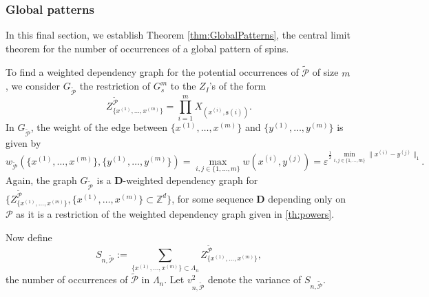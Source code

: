 \documentclass{amsart}
\newcommand{\field}[1]{\mathbb{#1}}
\newcommand{\Z}{\field{Z}}
\def\WDep{G}
\def\eps{\varepsilon}
\def\GP{\mathcal{\tilde{P}}}
\newcommand{\dist}[2]{\|#1 - #2\|_1}
\numberwithin{equation}{section}
\theoremstyle{remark}
\begin{document}
\subsubsection{Global patterns}
In this final section, we establish Theorem \ref{thm:GlobalPatterns}, the central limit theorem for the number of occurrences of a global pattern of spins.

To find a weighted dependency graph for the potential occurrences of $\GP$ of size $m$, we consider $\WDep_{\GP}$ the restriction of $\WDep_s^m$ to the $Z_I$'s of the form
\begin{equation}
  Z_{\{x^{(1)}, \dots ,x^{(m)}\}}^{\GP}= \prod_{i=1}^m X_{(x^{(i)},\mathfrak{s}(i))}.
  \label{eq:ZXGP}
\end{equation}
In $\WDep_{\GP}$, the weight of the edge between $\{x^{(1)}, \dots ,x^{(m)}\}$ and $\{y^{(1)}, \dots ,y^{(m)}\}$ is given by
\[ w_{\GP}(\{x^{(1)}, \dots ,x^{(m)}\},\{y^{(1)}, \dots ,y^{(m)}\})=\max_{i,j \in \{1, \dots , m\}} w(x^{(i)},y^{(j)})=\eps^{\frac{1}{2} \min_{i,j \in \{1, \dots , m\}}\dist{x^{(i)}}{y^{(j)}}}.\]
Again, the graph $\WDep_{\GP}$ is a $\mathbf{D}$-weighted dependency graph for $\{ Z_{\{x^{(1)}, \dots ,x^{(m)}\}}^{\GP},
\{x^{(1)}, \dots ,x^{(m)}\} \subset \Z^d\}$,
for some sequence $\mathbf{D}$ depending only on $\mathcal{P}$
as it is a restriction of the weighted dependency graph given in \cref{th:powers}.

Now define
$$S_{n,\GP} := \sum_{\{x^{(1)}, \dots ,x^{(m)}\} \subset \Lambda_n} Z_{\{x^{(1)}, \dots ,x^{(m)}\}}^{\GP},$$
the number of occurrences of $\GP$ in $\Lambda_n$.
Let $v_{n,\GP}^2$ denote the variance of $S_{n,\GP}$.
\end{document}
